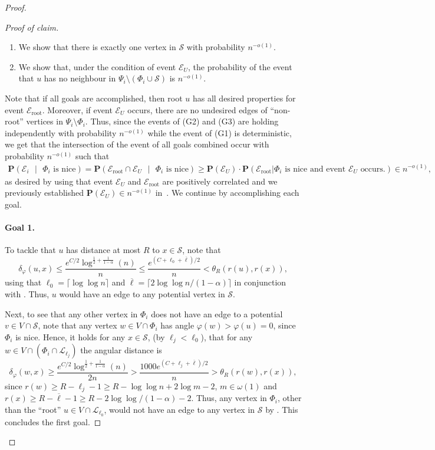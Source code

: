 \documentclass[letterpaper,11pt]{article}
\newcommand{\Prob}[1]{\mathbf{P}\left(#1\right)}
\newcommand{\1}{\mathbb I}
\newcommand{\Layer}[1]{\mathcal{L}_{#1}}
\newcommand{\angulardist}[2]{\delta_\varphi(#1,#2)}
\begin{document}
\begin{proof}
{\begin{proof}[Proof of claim]
\begin{enumerate}
    \item[(G2)] We show that there is exactly one vertex in $\mathcal{S}$ with probability $n^{-o(1)}$.
        
    \item[(G3)] We show that, under the condition of event $\mathcal{E}_U$, the probability of the event that $u$ has no neighbour in $\Psi_i \setminus (\Phi_i \cup \mathcal{S})$ is $n^{-o(1)}$.
\end{enumerate}
%
Note that if all goals are accomplished, then root $u$ has all desired properties for event $\mathcal{E}_{\text{root}}$. Moreover, if event $\mathcal{E}_U$ occurs, there are no undesired edges of ``non-root'' vertices in $\Psi_i \setminus \Phi_i$. Thus, since the events of (G2) and (G3) are holding independently with probability $n^{-o(1)}$ while the event of (G1) is deterministic, we get that the intersection of the event of all goals combined occur with probability $n^{-o(1)}$ such that
%
\begin{align*}
\Prob{\mathcal{E}_i \text{ }|\text{ } \Phi_i \text{ is nice}} = \Prob{\mathcal{E}_{\text{root}} \cap \mathcal{E}_{U} \text{ }|\text{ } \Phi_i \text{ is nice}} \geq \Prob{\mathcal{E}_U}\cdot \Prob{\mathcal{E}_{\text{root}} | \Phi_i \text{ is nice and event } \mathcal{E}_U \text{ occurs.}} \in n^{-o(1)},   
\end{align*}
%
as desired by using that event $\mathcal{E}_U$ and $\mathcal{E}_{\text{root}}$ are positively correlated and we previously established $\Prob{\mathcal{E}_U} \in n^{-o(1)}$ in~. We continue by accomplishing each goal.
%
\paragraph{Goal 1.} To tackle that $u$ has distance at most $R$ to $x \in \mathcal{S}$, note that
%
$$
\angulardist{u}{x} \leq \frac{e^{C/2}\log^{\frac{1}{2} + \frac{1}{1-\alpha}}(n)}{n} \leq \frac{e^{(C + \ell_0 + \overline{\ell})/2}}{n}< \theta_R(r(u), r(x)),
$$
%
using that $\ell_0 = \lceil \log\log n \rceil$ and $\overline{\ell} = \lceil 2\log\log n/(1-\alpha) \rceil$ in conjunction with . Thus, $u$ would have an edge to any potential vertex in $\mathcal{S}$.

Next, to see that any other vertex in $\Phi_i$ does not have an edge to a potential $v \in V \cap \mathcal{S}$, note that any vertex $w \in V \cap \Phi_i$ has angle $\varphi(w) > \varphi(u) = 0$, since $\Phi_i$ is nice. Hence, it holds for any $x \in \mathcal{S}$, (by $\ell_j < \ell_0$), that for any $w \in V \cap (\Phi_i \cap \Layer{\ell_j})$ the angular distance is 
%
$$
\angulardist{w}{x} \geq \frac{e^{C/2}\log^{\frac{1}{2} + \frac{1}{1-\alpha}}(n)}{2n} > \frac{1000 e^{(C + \ell_j + \overline{\ell})/2}}{n}> \theta_R(r(w), r(x)),
$$
%
since $r(w) \geq R - \ell_j - 1 \geq R - \log\log n + 2\log m - 2$, $m \in \omega(1)$ and $r(x) \geq R - \overline{\ell} - 1 \geq R - 2\log\log/(1-\alpha) - 2$. Thus, any vertex in $\Phi_i$, other than the ``root'' $u \in V \cap \Layer{\ell_0}$, would not have an edge to any vertex in $\mathcal{S}$ by . This concludes the first goal.


\end{proof}}
\end{proof}
\end{document}

